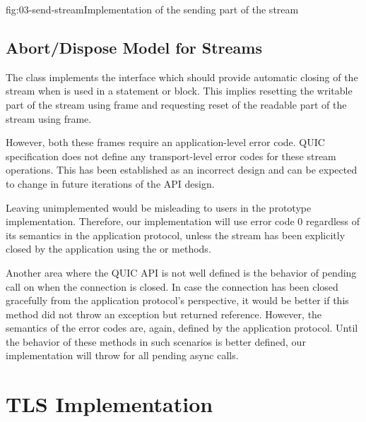 \begin{myFigure}{fig:03-send-stream}{Implementation of the sending part of the stream}

  \resizebox{\linewidth}{!}{}

\end{myFigure}


\subsection{Abort/Dispose Model for Streams}

The \QuicStream{} class implements the  interface which should provide
automatic closing of the stream when \QuicStream{} is used in a  statement or
 block. This implies resetting the writable part of the stream using \RESETSTREAM{}
frame and requesting reset of the readable part of the stream using \STOPSENDING{} frame.

However, both these frames require an application-level error code. QUIC specification does not
define any transport-level error codes for these stream operations. This has been established as an
incorrect design and can be expected to change in future iterations of the API design.

Leaving  unimplemented would be misleading to users in the prototype
implementation. Therefore, our implementation will use error code 0 regardless of its semantics in
the application protocol, unless the stream has been explicitly closed by the application using the
 or  methods.

Another area where the QUIC API is not well defined is the behavior of pending 
call on \QuicConnection{} when the connection is closed. In case the connection has been closed
gracefully from the application protocol's perspective, it would be better if this method did not
throw an exception but returned  reference. However, the semantics of the error codes
are, again, defined by the application protocol. Until the behavior of these methods in such
scenarios is better defined, our implementation will throw
 for all pending async calls.

\section{TLS Implementation}

